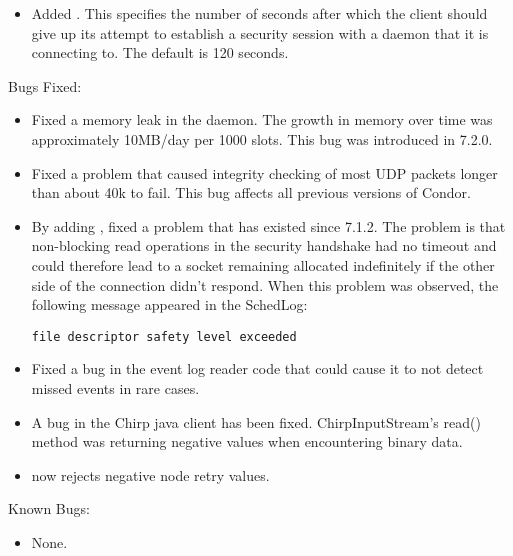 \begin{itemize}

\item Added .  This specifies the
number of seconds after which the client should give up its attempt to
establish a security session with a daemon that it is connecting to.
The default is 120 seconds.

\end{itemize}

\noindent Bugs Fixed:

\begin{itemize}

\item Fixed a memory leak in the  daemon.  The growth
in memory over time was approximately 10MB/day per 1000 slots.  This
bug was introduced in 7.2.0.

\item Fixed a problem that caused integrity checking of most UDP packets
longer than about 40k to fail.  This bug affects all previous versions of
Condor.

\item By adding , fixed a problem
that has existed since 7.1.2.  The problem is that non-blocking read
operations in the security handshake had no timeout and could therefore
lead to a socket remaining allocated indefinitely if the other side of
the connection didn't respond.  When this problem was observed, the following
message appeared in the SchedLog:

\begin{verbatim}
file descriptor safety level exceeded
\end{verbatim}

\item Fixed a bug in the event log reader code that could cause it to
  not detect missed events in rare cases.

\item A bug in the Chirp java client has been fixed.  ChirpInputStream's
read() method was returning negative values when encountering binary data.

\item {} now rejects negative node retry values.

\end{itemize}

\noindent Known Bugs:

\begin{itemize}

\item None.

\end{itemize}

